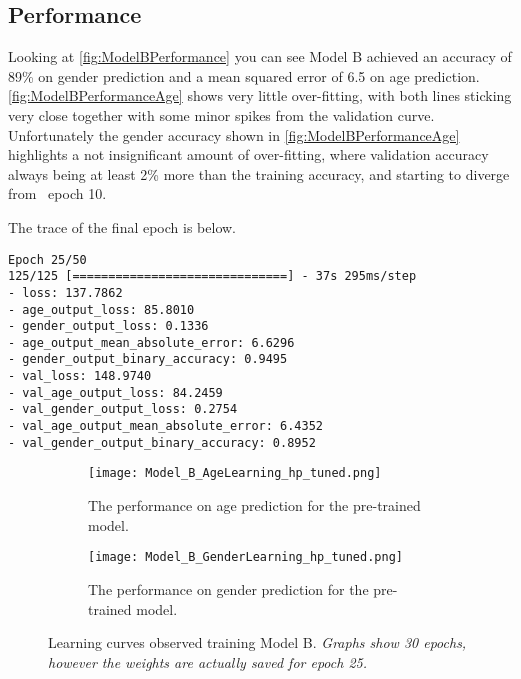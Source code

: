 \subsection{Performance}
Looking at \autoref{fig:ModelBPerformance} you can see Model B achieved an accuracy of 89\% on gender prediction and a mean squared error of 6.5 on age prediction. \\
\autoref{fig:ModelBPerformanceAge} shows very little over-fitting, with both lines sticking very close together with some minor spikes from the validation curve.\\
Unfortunately the gender accuracy shown in \autoref{fig:ModelBPerformanceAge} highlights a not insignificant amount of over-fitting, where validation accuracy always being at least 2\% more than the training accuracy, and starting to diverge from ~epoch 10.

The trace of the final epoch is below.
\begin{verbatim}
Epoch 25/50
125/125 [==============================] - 37s 295ms/step 
- loss: 137.7862 
- age_output_loss: 85.8010 
- gender_output_loss: 0.1336 
- age_output_mean_absolute_error: 6.6296 
- gender_output_binary_accuracy: 0.9495 
- val_loss: 148.9740 
- val_age_output_loss: 84.2459 
- val_gender_output_loss: 0.2754 
- val_age_output_mean_absolute_error: 6.4352 
- val_gender_output_binary_accuracy: 0.8952
\end{verbatim}

\begin{figure}[h!]
    \begin{subfigure}{\textwidth}
        \centering
        \texttt{[image: Model\_B\_AgeLearning\_hp\_tuned.png]}
    \caption{\label{fig:ModelBPerformanceAge}The performance on age prediction for the pre-trained model.}
    \end{subfigure}
    \begin{subfigure}{\textwidth}
        \centering
        \texttt{[image: Model\_B\_GenderLearning\_hp\_tuned.png]}
        \caption{\label{fig:ModelBPerformanceGender}The performance on gender prediction for the pre-trained model.}    
    \end{subfigure}
    \centering
    \caption{
        \label{fig:ModelBPerformance}Learning curves observed training Model B. \textit{Graphs show 30 epochs, however the weights are actually saved for epoch 25.}
        }
\end{figure}

